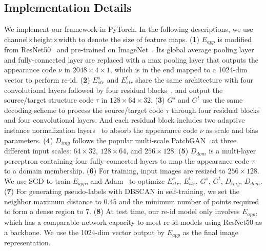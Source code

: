 \documentclass[runningheads]{llncs}
\begin{document}
\subsection{Implementation Details}
















We implement our framework in PyTorch. In the following descriptions, we use channel$\times$height$\times$width to denote the size of feature maps. 
(\textbf{1}) $E_{app}$ is modified from ResNet50~\cite{he2016deep} and  pre-trained on ImageNet~\cite{imagenet}. Its global average pooling layer and fully-connected layer are replaced with a max pooling layer that outputs the appearance code $\nu$ in $2048\times4\times1$, which is in the end mapped to a 1024-dim vector to perform re-id. (\textbf{2}) $E_{str}^s$ and $E_{str}^t$ share the same architecture with four convolutional layers followed by four residual blocks~\cite{he2016deep}, and output the source/target structure code $\tau$ in $128\times64\times32$. (\textbf{3}) $G^s$ and $G^t$ use the same decoding scheme to process the source/target code $\tau$ through four residual blocks and four convolutional layers. And each residual block includes two adaptive instance normalization layers~\cite{huang2017arbitrary} to absorb the appearance code $\nu$ as scale and bias parameters. (\textbf{4}) $D_{img}$ follows the popular multi-scale PatchGAN~\cite{isola2017image} at three different input scales: $64\times32$, $128\times64$, and $256\times128$. (\textbf{5}) $D_{dom}$ is a multi-layer perceptron containing four fully-connected layers to map the appearance code $\tau$ to a domain membership. 
(\textbf{6}) For training, input images are resized to $256\times128$. We use SGD to train $E_{app}$, and Adam~\cite{kingma2014adam} to optimize $E_{str}^s$, $E_{str}^t$, $G^s$, $G^t$, $D_{img}$, $D_{dom}$. (\textbf{7}) For generating pseudo-labels with DBSCAN in self-training, we set the neighbor maximum distance to $0.45$ and the minimum number of points required to form a dense region to $7$. (\textbf{8}) At test time, our re-id model only involves $E_{app}$, which has a comparable network capacity to most re-id models using ResNet50 as a backbone. We use the 1024-dim vector output by $E_{app}$ as the final image representation. 
\end{document}
